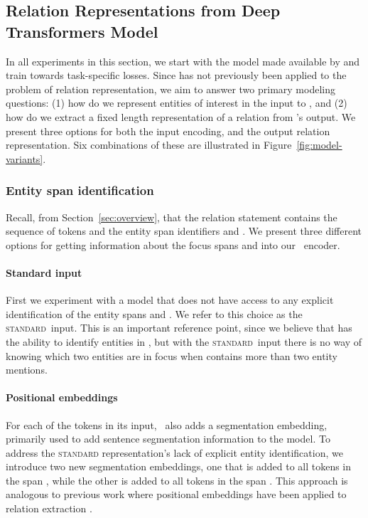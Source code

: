 \subsection{Relation Representations from Deep Transformers Model}
\label{sec:transformers-results}


In all experiments in this section, we start with the \bert model made available by \citet{devlin2018bert} and train towards task-specific losses.
Since \bert{} has not previously been applied to the problem of relation representation, we aim to answer two primary modeling questions: (1) how do we represent entities of interest in the input to \bert{}, and (2) how do we extract a fixed length representation of a relation from \bert{}'s output.
We present three options for both the input encoding, and the output relation representation. Six combinations of these are illustrated in Figure~\ref{fig:model-variants}.

\begin{comment}
Unlike previous relation classification systems which typically use external
features as input, such as named entity recognition (NER) tags and
part-of-speech (POS) tags,  the classifiers  we train simply use input text as features.
\end{comment}




\subsubsection{Entity span identification}
Recall, from Section~\ref{sec:overview}, that the relation statement   contains the sequence of tokens  and the entity span identifiers  and .
We present three different options for getting information about the focus spans  and  into our \bert~encoder.

\paragraph{Standard input}
First we experiment with a \bert{} model that does not have access to any explicit identification of the entity spans  and . 
We refer to this choice as the \textsc{standard}~input.
This is an important reference point, since we believe that \bert{} has the ability to identify entities in , but with the \textsc{standard}~input there is no way of knowing which two entities are in focus when  contains more than two entity mentions. 

\paragraph{Positional embeddings}
For each of the tokens in its input, \bert~also adds a segmentation embedding, primarily used to add sentence segmentation information to the model.
To address the \textsc{standard} representation's lack of explicit entity identification, we introduce two new segmentation embeddings, one that is added to all tokens in the span , while the other is added to all tokens in the span . 
This approach is analogous to previous work where positional embeddings
    have been applied to relation extraction \cite{zhang2017position, DBLP:journals/corr/abs-1807-03052}.
    



